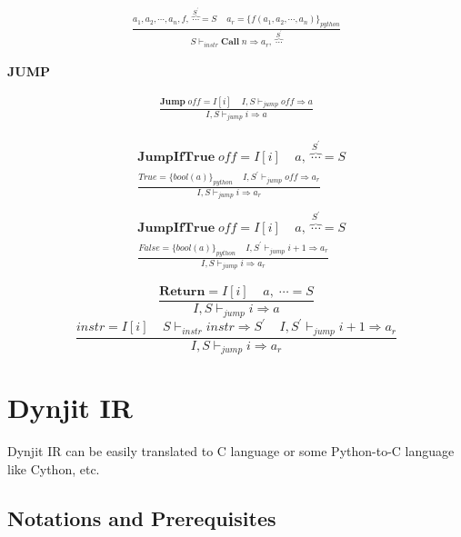 \documentclass[12pt, a4paper]{report}
\newcommand{\ddfrac}[3]{
    & #1 \\
    & \frac { #2 } { #3 }
}
\newcommand{\rulegroup}[1]{
    \textbf{#1}
}
\newcommand{\gap}{ \;\;\;\; }
\begin{document}
\begin{equation*}
\begin{split}
\frac{
    a_1, a_2 , \cdots, a_n, f, \; \overbrace{\cdots}^{S^{'}} = S
    \gap
    a_{r} = \{f(a_1, a_2, \cdots, a_n)\}_{python}
}{
    S \vdash_{instr} \mathbf{Call}\;n \Rightarrow a_{r}, \; \overbrace{\cdots}^{S^{'}}
}
\end{split}
\end{equation*}

\hrulefill

\rulegroup{JUMP}

\begin{equation*}
\begin{split}
\frac{ \mathbf{Jump} \; \mathit{off} = I[i] \;\;\;\; I, S \vdash_{jump} \mathit{off} \Rightarrow a}
     { I, S \vdash_{jump} i \Rightarrow a}
\end{split}
\end{equation*}


\begin{equation*}
\begin{split}
\ddfrac{
    \mathbf{JumpIfTrue} \; \mathit{off} = I[i]
    \gap
    a, \; \overbrace{\cdots}^{S^{'}} = S
}{
    True = \{bool(a)\}_{python}
     \gap
    I, S^{'} \vdash_{jump} \mathit{off} \Rightarrow a_r
}{ I, S \vdash_{jump} i \Rightarrow a_r }
\\\\
\ddfrac{
    \mathbf{JumpIfTrue} \; \mathit{off} = I[i]
    \gap
    a, \; \overbrace{\cdots}^{S^{'}} = S
}{
    False = \{bool(a)\}_{python}
    \gap
    I, S^{'} \vdash_{jump} \mathit{i}+1 \Rightarrow a_r
}{ I, S \vdash_{jump} i \Rightarrow a_r}
\end{split}
\end{equation*}


$$
\dfrac{
    \mathbf{Return} = I[i]
    \gap
    a, \; \cdots = S
}{
    I, S \vdash_{jump} i \Rightarrow a
}    
$$
$$
\dfrac{
    \mathit{instr} = I[i]
    \gap
    S \vdash_{instr} instr \Rightarrow S^{'}
    \gap
    I, S^{'} \vdash_{jump} i + 1 \Rightarrow a_r
}{
    I, S \vdash_{jump} i \Rightarrow a_r
}
$$


\section*{Dynjit IR}

Dynjit IR can be easily translated to C language or some Python-to-C language like Cython, etc.

\subsection*{Notations and Prerequisites}
\end{document}
